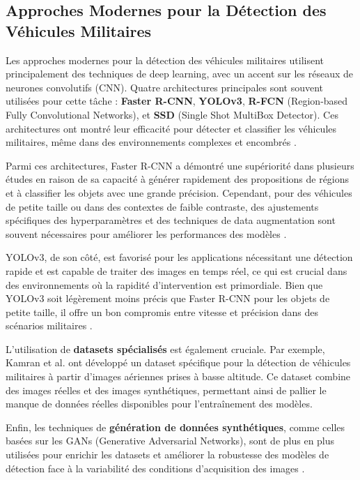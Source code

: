 \subsection{Approches Modernes pour la Détection des Véhicules Militaires}

Les approches modernes pour la détection des véhicules militaires utilisent principalement des techniques de deep learning, avec un accent sur les réseaux de neurones convolutifs (CNN). Quatre architectures principales sont souvent utilisées pour cette tâche : \textbf{Faster R-CNN}, \textbf{YOLOv3}, \textbf{R-FCN} (Region-based Fully Convolutional Networks), et \textbf{SSD} (Single Shot MultiBox Detector). Ces architectures ont montré leur efficacité pour détecter et classifier les véhicules militaires, même dans des environnements complexes et encombrés \cite{kamran2020, gupta2021}.

Parmi ces architectures, Faster R-CNN a démontré une supériorité dans plusieurs études en raison de sa capacité à générer rapidement des propositions de régions et à classifier les objets avec une grande précision. Cependant, pour des véhicules de petite taille ou dans des contextes de faible contraste, des ajustements spécifiques des hyperparamètres et des techniques de data augmentation sont souvent nécessaires pour améliorer les performances des modèles \cite{gupta2021}.

YOLOv3, de son côté, est favorisé pour les applications nécessitant une détection rapide et est capable de traiter des images en temps réel, ce qui est crucial dans des environnements où la rapidité d'intervention est primordiale. Bien que YOLOv3 soit légèrement moins précis que Faster R-CNN pour les objets de petite taille, il offre un bon compromis entre vitesse et précision dans des scénarios militaires \cite{gupta2021}.

L'utilisation de \textbf{datasets spécialisés} est également cruciale. Par exemple, Kamran et al. \cite{kamran2020} ont développé un dataset spécifique pour la détection de véhicules militaires à partir d'images aériennes prises à basse altitude. Ce dataset combine des images réelles et des images synthétiques, permettant ainsi de pallier le manque de données réelles disponibles pour l'entraînement des modèles.

Enfin, les techniques de \textbf{génération de données synthétiques}, comme celles basées sur les GANs (Generative Adversarial Networks), sont de plus en plus utilisées pour enrichir les datasets et améliorer la robustesse des modèles de détection face à la variabilité des conditions d'acquisition des images \cite{spie2020}.

